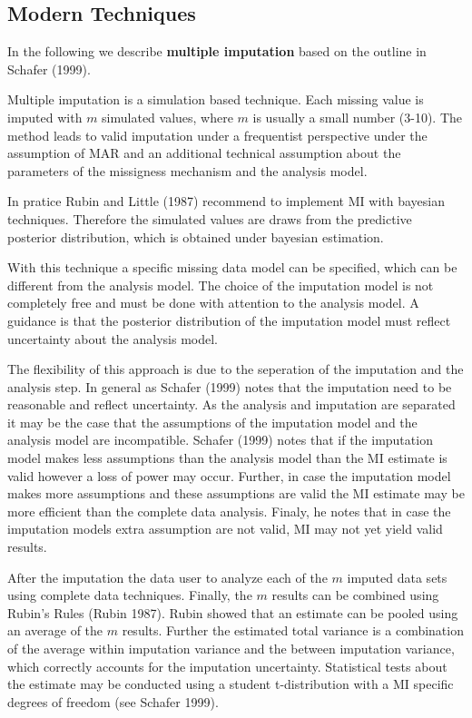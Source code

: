 \subsection{Modern Techniques} 
 In the following we describe \textbf{multiple imputation} based on the outline in Schafer (1999). \par  
Multiple imputation is a simulation based technique. Each missing value is imputed with $m$  simulated  values, where $m$ is usually a small number (3-10). The method leads to valid imputation under a frequentist perspective under the assumption of MAR and an additional technical assumption about the parameters of the missigness mechanism and the analysis model. \par 
  In pratice Rubin and Little (1987) recommend to implement MI with bayesian techniques. Therefore the simulated values are draws from the predictive posterior distribution, which is obtained under bayesian estimation.  \par
 With this technique a specific missing data model can be specified, which can be different from the analysis model. The choice of the imputation model is not completely free and must be done with attention to the analysis model. A guidance is that the posterior distribution of the imputation model must reflect uncertainty about the analysis model. \par The flexibility of this approach is due to the seperation of the imputation and the analysis step. In general as Schafer (1999) notes that the imputation need to be reasonable and reflect uncertainty. As the analysis and imputation are separated it may be the case that the assumptions of the imputation model and the analysis model are incompatible. Schafer (1999) notes that if the imputation model makes less assumptions than the  analysis model than the MI estimate is valid however a loss of power may occur. Further, in case the imputation model makes more assumptions and these assumptions are valid the MI estimate may be more efficient than the complete data analysis. Finaly, he notes that in case the imputation models extra assumption are not valid, MI may not yet yield valid results.  \par 
After the imputation  the data user to analyze each of the $m$ imputed data sets using complete data techniques. Finally, the $m$ results can be combined using Rubin's Rules (Rubin 1987).  Rubin showed that an estimate can be pooled using an average of the $m$ results. Further the estimated total variance is a combination of the average within imputation variance and the between imputation variance, which correctly accounts for the imputation uncertainty. Statistical tests about the estimate may be conducted using a student t-distribution with a MI specific degrees of freedom (see Schafer 1999).   \par 
